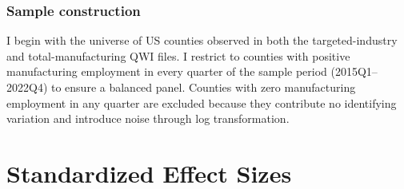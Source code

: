 \documentclass[12pt]{article}
\begin{document}
\subsubsection*{Sample construction} I begin with the universe of US counties observed in both the targeted-industry and total-manufacturing QWI files. I restrict to counties with positive manufacturing employment in every quarter of the sample period (2015Q1--2022Q4) to ensure a balanced panel. Counties with zero manufacturing employment in any quarter are excluded because they contribute no identifying variation and introduce noise through log transformation.


\section{Standardized Effect Sizes}
\label{sec:sde}


\end{document}
